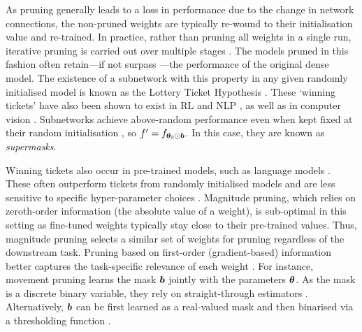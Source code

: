 \documentclass[10pt]{article} %
\begin{document}
As pruning generally leads to a loss in performance due to the change in network connections, the non-pruned weights are typically re-wound to their initialisation value and re-trained. In practice, rather than pruning all weights in a single run, iterative pruning is carried out over multiple stages \citep{han2015learning,Frankle2019}. The models pruned in this fashion often retain---if not surpass ---the performance of the original dense model. The existence of a subnetwork with this property in any given randomly initialised model is known as the Lottery Ticket Hypothesis \citep[LTH;][]{Frankle2019,chen2020lottery}.
These `winning tickets' have also been shown to exist in RL and NLP \citep{Yu2020}, as well as in computer vision \citep{Frankle2020LinearModeConnect}. Subnetworks achieve above-random performance even when kept fixed at their random initialisation \citep{zhou2019deconstructing,wortsman2020supermasks, zhao-etal-2020-masking}, so $f^\prime = f_{{\bm{\theta}}_0 \odot {\bm{b}}}$. In this case, they are known as \emph{supermasks}.

Winning tickets also occur in pre-trained models, such as language models \citep{chen2020lottery,prasanna-etal-2020-bert}. These often outperform tickets from randomly initialised models \citep{prasanna-etal-2020-bert} and are less sensitive to specific hyper-parameter choices \citep{sun2020learning}.
Magnitude pruning, which relies on zeroth-order information (the absolute value of a weight), is sub-optimal in this setting as fine-tuned weights typically stay close to their pre-trained values. Thus, magnitude pruning selects a similar set of weights for pruning regardless of the downstream task. Pruning based on first-order (gradient-based) information better captures the task-specific relevance of each weight \citep{Molchanov2017}. For instance, movement pruning \citep{sanh2020movement} learns the mask ${\bm{b}}$ jointly with the parameters ${\bm{\theta}}$. As the mask is a discrete binary variable, they rely on straight-through estimators \citep{bengio2013estimating}. Alternatively,
${\bm{b}}$ can be first learned as a real-valued mask and then binarised via a thresholding function \citep{mallya2018piggyback}.
\end{document}

